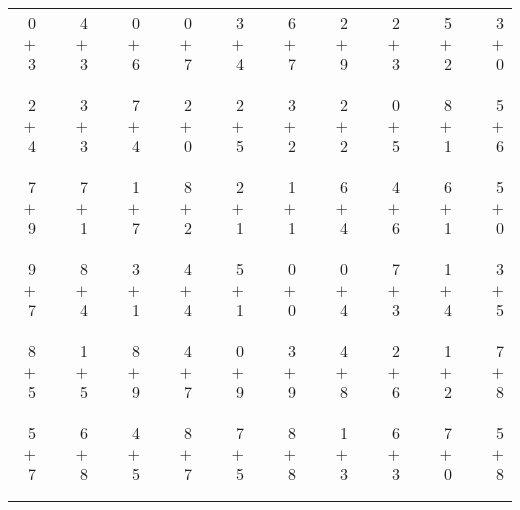 \documentclass[12pt, letterpaper]{article}
\begin{document}
\begin{tabular}{rrrrrrrrrrrrrrrrrrr}
0 & & 4 & & 0 & & 0 & & 3 & & 6 & & 2 & & 2 & & 5 & & 3\\
$+$ 3 & & $+$ 3 & & $+$ 6 & & $+$ 7 & & $+$ 4 & & $+$ 7 & & $+$ 9 & & $+$ 3 & & $+$ 2 & & $+$ 0\\
\cline{1-1} \cline{3-3} \cline{5-5} \cline{7-7} \cline{9-9} \cline{11-11} \cline{13-13} \cline{15-15} \cline{17-17} \cline{19-19} \\ \\
2 & & 3 & & 7 & & 2 & & 2 & & 3 & & 2 & & 0 & & 8 & & 5\\
$+$ 4 & & $+$ 3 & & $+$ 4 & & $+$ 0 & & $+$ 5 & & $+$ 2 & & $+$ 2 & & $+$ 5 & & $+$ 1 & & $+$ 6\\
\cline{1-1} \cline{3-3} \cline{5-5} \cline{7-7} \cline{9-9} \cline{11-11} \cline{13-13} \cline{15-15} \cline{17-17} \cline{19-19} \\ \\
7 & & 7 & & 1 & & 8 & & 2 & & 1 & & 6 & & 4 & & 6 & & 5\\
$+$ 9 & & $+$ 1 & & $+$ 7 & & $+$ 2 & & $+$ 1 & & $+$ 1 & & $+$ 4 & & $+$ 6 & & $+$ 1 & & $+$ 0\\
\cline{1-1} \cline{3-3} \cline{5-5} \cline{7-7} \cline{9-9} \cline{11-11} \cline{13-13} \cline{15-15} \cline{17-17} \cline{19-19} \\ \\
9 & & 8 & & 3 & & 4 & & 5 & & 0 & & 0 & & 7 & & 1 & & 3\\
$+$ 7 & & $+$ 4 & & $+$ 1 & & $+$ 4 & & $+$ 1 & & $+$ 0 & & $+$ 4 & & $+$ 3 & & $+$ 4 & & $+$ 5\\
\cline{1-1} \cline{3-3} \cline{5-5} \cline{7-7} \cline{9-9} \cline{11-11} \cline{13-13} \cline{15-15} \cline{17-17} \cline{19-19} \\ \\
8 & & 1 & & 8 & & 4 & & 0 & & 3 & & 4 & & 2 & & 1 & & 7\\
$+$ 5 & & $+$ 5 & & $+$ 9 & & $+$ 7 & & $+$ 9 & & $+$ 9 & & $+$ 8 & & $+$ 6 & & $+$ 2 & & $+$ 8\\
\cline{1-1} \cline{3-3} \cline{5-5} \cline{7-7} \cline{9-9} \cline{11-11} \cline{13-13} \cline{15-15} \cline{17-17} \cline{19-19} \\ \\
5 & & 6 & & 4 & & 8 & & 7 & & 8 & & 1 & & 6 & & 7 & & 5\\
$+$ 7 & & $+$ 8 & & $+$ 5 & & $+$ 7 & & $+$ 5 & & $+$ 8 & & $+$ 3 & & $+$ 3 & & $+$ 0 & & $+$ 8\\
\cline{1-1} \cline{3-3} \cline{5-5} \cline{7-7} \cline{9-9} \cline{11-11} \cline{13-13} \cline{15-15} \cline{17-17} \cline{19-19} \\ \\

\end{tabular}
\end{document}
